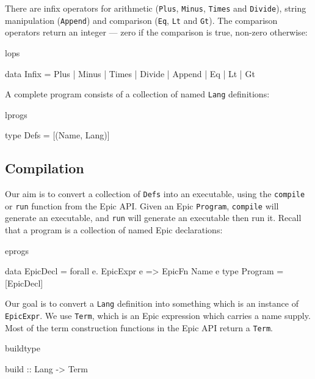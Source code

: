 \noindent
There are infix operators for arithmetic (\texttt{Plus},
\texttt{Minus}, \texttt{Times} and \texttt{Divide}), string
manipulation (\texttt{Append}) and comparison (\texttt{Eq},
\texttt{Lt} and \texttt{Gt}). The comparison operators return an
integer --- zero if the comparison is true, non-zero otherwise:

\begin{SaveVerbatim}{lops}

data Infix = Plus | Minus | Times | Divide | Append | Eq | Lt | Gt

\end{SaveVerbatim}

\noindent
A complete program consists of a collection of named \texttt{Lang}
definitions:

\begin{SaveVerbatim}{lprogs}

type Defs = [(Name, Lang)]
\end{SaveVerbatim}

\subsection{Compilation}

Our aim is to convert a collection of \texttt{Defs} into an
executable, using the \texttt{compile} or \texttt{run} function from
the Epic API.
Given an Epic \texttt{Program}, \texttt{compile} will generate an
executable, and \texttt{run} will generate an executable then run it.
Recall that a program is a collection of named Epic declarations:

\begin{SaveVerbatim}{eprogs}

data EpicDecl = forall e. EpicExpr e => EpicFn Name e
type Program = [EpicDecl]

\end{SaveVerbatim}

\noindent
Our goal is to convert a \texttt{Lang} definition into
something which is an instance of \texttt{EpicExpr}. We use
\texttt{Term}, which is an Epic expression which carries a name
supply. Most of the term construction functions in the Epic API return
a \texttt{Term}.

\begin{SaveVerbatim}{buildtype}

build :: Lang -> Term

\end{SaveVerbatim}

